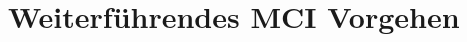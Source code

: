
\chapter{Weiterführendes MCI Vorgehen}


\newpage



\newpage



\newpage



\newpage



\newpage



\newpage

